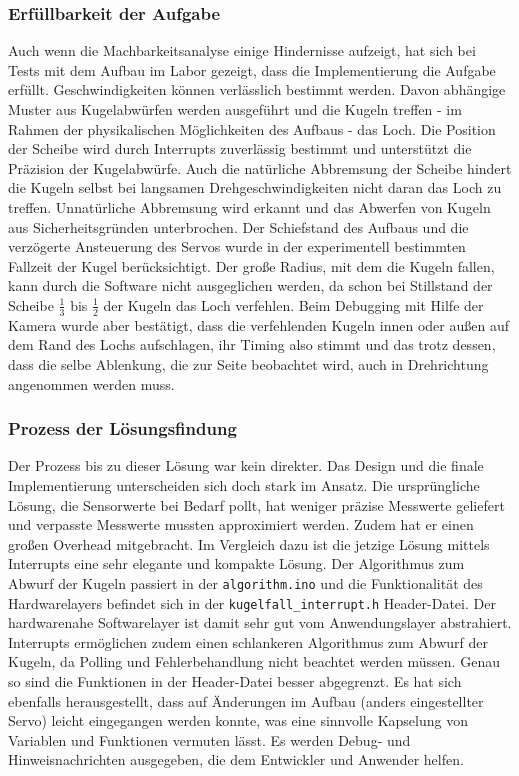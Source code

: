 \documentclass{kis}
\begin{document}
\subsubsection{Erfüllbarkeit der Aufgabe}
Auch wenn die Machbarkeitsanalyse einige Hindernisse aufzeigt, hat sich bei Tests mit dem Aufbau im Labor gezeigt, dass die Implementierung die Aufgabe erfüllt. Geschwindigkeiten können verlässlich bestimmt werden. Davon abhängige Muster aus Kugelabwürfen werden ausgeführt und die Kugeln treffen - im Rahmen der physikalischen Möglichkeiten des Aufbaus - das Loch. Die Position der Scheibe wird durch Interrupts zuverlässig bestimmt und unterstützt die Präzision der Kugelabwürfe. Auch die natürliche Abbremsung der Scheibe hindert die Kugeln selbst bei langsamen Drehgeschwindigkeiten nicht daran das Loch zu treffen. Unnatürliche Abbremsung wird erkannt und das Abwerfen von Kugeln aus Sicherheitsgründen unterbrochen. Der Schiefstand des Aufbaus und die verzögerte Ansteuerung des Servos wurde in der experimentell bestimmten Fallzeit der Kugel berücksichtigt. Der große Radius, mit dem die Kugeln fallen, kann durch die Software nicht ausgeglichen werden, da schon bei Stillstand der Scheibe $\frac{1}{3}$ bis $\frac{1}{2}$ der Kugeln das Loch verfehlen. Beim Debugging mit Hilfe der Kamera wurde aber bestätigt, dass die verfehlenden Kugeln innen oder außen auf dem Rand des Lochs aufschlagen, ihr Timing also stimmt und das trotz dessen, dass die selbe Ablenkung, die zur Seite beobachtet wird, auch in Drehrichtung angenommen werden muss.

\subsubsection{Prozess der Lösungsfindung}
Der Prozess bis zu dieser Lösung war kein direkter. Das Design und die finale Implementierung unterscheiden sich doch stark im Ansatz. Die ursprüngliche Lösung, die Sensorwerte bei Bedarf pollt, hat weniger präzise Messwerte geliefert und verpasste Messwerte mussten approximiert werden. Zudem hat er einen großen Overhead mitgebracht. Im Vergleich dazu ist die jetzige Lösung mittels Interrupts eine sehr elegante und kompakte Lösung. Der Algorithmus zum Abwurf der Kugeln passiert in der \texttt{algorithm.ino} und die Funktionalität des Hardwarelayers befindet sich in der \texttt{kugelfall\_interrupt.h} Header-Datei. Der hardwarenahe Softwarelayer ist damit sehr gut vom Anwendungslayer abstrahiert. Interrupts ermöglichen zudem einen schlankeren Algorithmus zum Abwurf der Kugeln, da Polling und Fehlerbehandlung nicht beachtet werden müssen. Genau so sind die Funktionen in der Header-Datei besser abgegrenzt. Es hat sich ebenfalls herausgestellt, dass auf Änderungen im Aufbau (anders eingestellter Servo) leicht eingegangen werden konnte, was eine sinnvolle Kapselung von Variablen und Funktionen vermuten lässt. Es werden Debug- und Hinweisnachrichten ausgegeben, die dem Entwickler und Anwender helfen.
\end{document}
